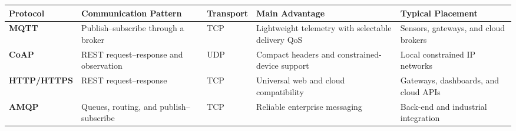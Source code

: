 \noindent\begin{minipage}{\textwidth}
\centering
{}
\scriptsize
  \setlength{\tabcolsep}{2.5pt}
  \renewcommand{\arraystretch}{1.12}
  \begin{tabular}{@{}>{\bfseries\RaggedRight\arraybackslash}p{}
                      >{\RaggedRight\arraybackslash}p{}
                      >{\Centering\arraybackslash}p{}
                      >{\RaggedRight\arraybackslash}p{}
                      >{\RaggedRight\arraybackslash}p{}@{}}
    \toprule
    \textbf{Protocol} & \textbf{Communication Pattern} & \textbf{Transport} & \textbf{Main Advantage} & \textbf{Typical Placement} \\
    \midrule
    MQTT & Publish--subscribe through a broker & TCP & Lightweight telemetry with selectable delivery QoS & Sensors, gateways, and cloud brokers \\
    CoAP & REST request--response and observation & UDP & Compact headers and constrained-device support & Local constrained IP networks \\
    HTTP/HTTPS & REST request--response & TCP & Universal web and cloud compatibility & Gateways, dashboards, and cloud APIs \\
    AMQP & Queues, routing, and publish--subscribe & TCP & Reliable enterprise messaging & Back-end and industrial integration \\
    \bottomrule
  \end{tabular}
\end{minipage}
\par\vspace{4pt}
\noindent
\par\vspace{4pt}

